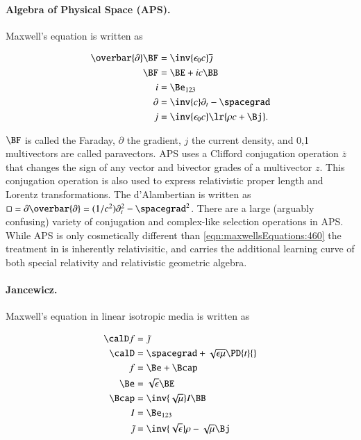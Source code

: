 \paragraph{Algebra of Physical Space (APS).  \citep{baylis2004electrodynamics}}
Maxwell's equation is written as

\begin{dmath}\label{eqn:galiterature:40}
\begin{aligned}
\overbar{\partial} \BF &= \inv{\epsilon_0 c} \overline{\jmath} \\
\BF &= \BE + i c \BB \\
i &= \Be_{123} \\
\partial &= \inv{c} \partial_t - \spacegrad \\
j &= \inv{\epsilon_0 c} \lr{ \rho c + \Bj }.
\end{aligned}
\end{dmath}

\( \BF \) is called the Faraday, \( \partial \) the gradient, \( j \) the current density, and
0,1 multivectors are called paravectors.
APS uses a Clifford conjugation operation \( \overbar{z} \) that changes the sign of any vector and bivector grades of a multivector \( z \).
This conjugation operation is also used to express relativistic proper length and Lorentz transformations.
The d'Alambertian is written as \( \Box = \partial \overbar{\partial} = (1/c^2) \partial_t^2 - \spacegrad^2 \).
There are a large (arguably confusing) variety of conjugation and complex-like selection operations in APS.
While APS is only cosmetically different than \cref{eqn:maxwellsEquations:460} the treatment in \citep{baylis2004electrodynamics} is inherently relativisitic, and carries the additional learning curve of both special relativity and relativistic geometric algebra.

\paragraph{Jancewicz.  \citep{jancewicz1988multivectors}}

Maxwell's equation in linear isotropic media is written as

\begin{dmath}\label{eqn:galiterature:20}
\begin{aligned}
\calD f &= \tilde{\jmath} \\
\calD &= \spacegrad + \sqrt{\epsilon\mu} \PD{t}{} \\
f &= \Be + \Bcap \\
\Be &= \sqrt{\epsilon} \BE \\
\Bcap &= \inv{\sqrt{\mu}} I \BB \\
I &= \Be_{123} \\
\tilde{\jmath} &= \inv{\sqrt{\epsilon}}\rho - \sqrt{\mu} \Bj \\
\end{aligned}
\end{dmath}


